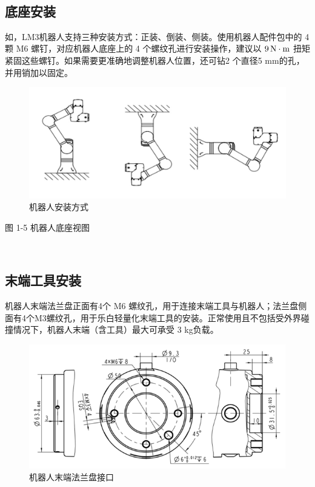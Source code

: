  
\subsection{底座安装}
如，LM3机器人支持三种安装方式：正装、倒装、侧装。使用机器人配件包中的 4 颗 M6 螺钉，对应机器人底座上的 4 个螺纹孔进行安装操作，建议以 $9\,\mathrm{N\cdot m}$ 扭矩紧固这些螺钉。如果需要更准确地调整机器人位置，还可钻2 个直径5 mm的孔，并用销加以固定。
  

\begin{figure}[ht]
    \centering
    \includegraphics[width=\textwidth]{image/1-4-direction.jpg}
    \caption{机器人安装方式}
    \label{fig:机器人安装方式}
\end{figure}

 
图 1-5  机器人底座视图




 

 
 
\subsection{末端工具安装}

机器人末端法兰盘正面有4个 M6 螺纹孔，用于连接末端工具与机器人；法兰盘侧面有4个M3螺纹孔，用于乐白轻量化末端工具的安装。正常使用且不包括受外界碰撞情况下，机器人末端（含工具）最大可承受 3 kg负载。



\begin{figure}[ht]
    \centering
    \includegraphics[width=\textwidth]{image/1-6-flange.png}
    \caption{机器人末端法兰盘接口}
    \label{fig:机器人末端法兰盘接口}
\end{figure}
